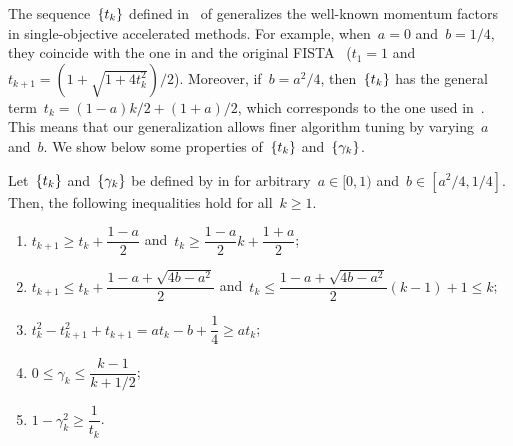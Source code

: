 \documentclass[../main]{subfiles}
\begin{document}
The sequence~$\set{t_k}$ defined in~ of  generalizes the well-known momentum factors in single-objective accelerated methods.
For example, when~$a = 0$ and~$b = 1 / 4$, they coincide with the one in  and the original FISTA~\cite{Nesterov1983,Beck2009} ($t_1 = 1$ and~$t_{k + 1} = (1 + \sqrt{1 + 4 t_k^2}) / 2$).
Moreover, if~$b = a^2 / 4$, then~$\set{t_k}$ has the general term~$t_k = (1 - a) k / 2 + (1 + a) / 2$, which corresponds to the one used in~\cite{Chambolle2015,Su2016,Attouch2016,Attouch2018}.
This means that our generalization allows finer algorithm tuning by varying~$a$ and~$b$.
We show below some properties of~$\set*{t_k}$ and~$\set*{\gamma_k}$.
\begin{lemma} 
    Let~$\set{t_k}$ and~$\set{\gamma_k}$ be defined by  in  for arbitrary~$a \in [0, 1)$ and~$b \in [a^2 / 4, 1 / 4]$.
    Then, the following inequalities hold for all~$k \ge 1$.
    \begin{enumerate}
        \item $t_{k + 1} \ge t_k + \dfrac{1 - a}{2}$ and~$t_k \ge \dfrac{1 - a}{2} k + \dfrac{1 + a}{2}$; 
        \item $t_{k + 1} \le t_k + \dfrac{1 - a + \sqrt{4b - a^2}}{2}$ and~$t_k \le \dfrac{1 - a + \sqrt{4b - a^2}}{2} (k - 1) + 1 \le k$; 
        \item $t_k^2 - t_{k + 1}^2 + t_{k + 1} = a t_k - b + \dfrac{1}{4} \ge a t_k$; 
        \item $0 \le \gamma_k \le \dfrac{k - 1}{k + 1 / 2}$; 
        \item $1 - \gamma_k^2 \ge \dfrac{1}{t_k}$. 
    \end{enumerate}
\end{lemma}
\end{document}
